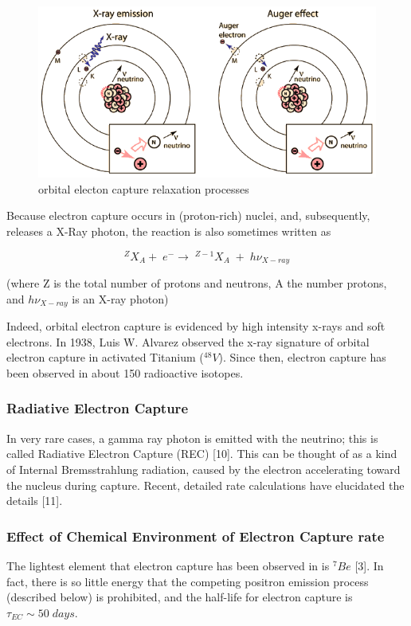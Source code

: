 \documentclass[11pt]{amsart}
\begin{document}
\begin{figure}
   \includegraphics[scale=0.5]{img/ecrelax.png}
   \caption{orbital electon capture relaxation processes}
  \label{fig:ec1}
\end{figure}

Because electron capture occurs in (proton-rich) nuclei, and, subsequently, releases a X-Ray photon, the reaction is also sometimes written as

$$^{Z}X_{A}+\;e^{-}\rightarrow\;^{Z-1}X_{A}\;+\;h\nu_{X-ray}$$

(where Z is the total number of protons and neutrons, A the number protons, and $h\nu_{X-ray}$ is an X-ray photon)

Indeed, orbital electron capture is evidenced by high intensity x-rays and soft electrons.  In 1938, Luis W. Alvarez observed the x-ray signature of orbital electron capture in activated Titanium ($^{48}V$). Since then, electron capture has been observed in about 150 radioactive isotopes.


\subsubsection{Radiative Electron Capture}

In very rare cases, a gamma ray photon is emitted with the neutrino; this is called Radiative Electron Capture (REC) [10]. This can be thought of as a kind of Internal Bremsstrahlung radiation, caused by the electron accelerating toward the nucleus during capture. Recent, detailed rate calculations have elucidated the details [11].

\subsubsection{Effect of Chemical Environment of Electron Capture rate} 
The lightest element that electron capture has been observed in is $^{7}Be$ [3]. In fact, there is so little energy that the competing positron emission process (described below) is prohibited, and the half-life for electron capture is $\tau_{EC}\sim 50\;days$.
\end{document}
